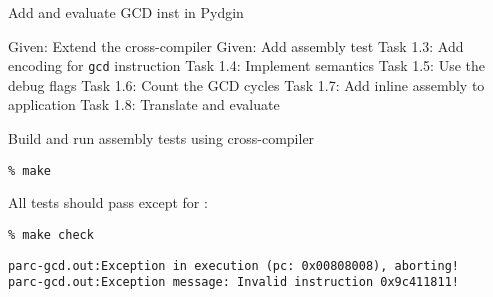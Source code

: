 \begin{frame}{ Add and evaluate GCD inst in Pydgin}
\begin{cbxlist}
  \1 Given: Extend the cross-compiler
  \1 Given: Add assembly test
  \1 
  \1 
  \1 Task 1.3: Add encoding for \texttt{gcd} instruction
  \1 Task 1.4: Implement semantics
  \1 Task 1.5: Use the debug flags
  \1 Task 1.6: Count the GCD cycles
  \1 Task 1.7: Add inline assembly to application
  \1 Task 1.8: Translate and evaluate
\end{cbxlist}
\end{frame}


\begin{task}
\begin{frame}[fragile]{Build and run assembly tests using cross-compiler}

\begin{Verbatim}[commandchars=\\\{\}]
% cd \midtilde/pydgin-tut/parc/asm_tests/build
% make
\end{Verbatim}

All tests should pass except for :

\begin{verbatim}
% make check
\end{verbatim}

{\small
\begin{verbatim}
parc-gcd.out:Exception in execution (pc: 0x00808008), aborting!
parc-gcd.out:Exception message: Invalid instruction 0x9c411811!
\end{verbatim}}

\end{frame}
\end{task}


